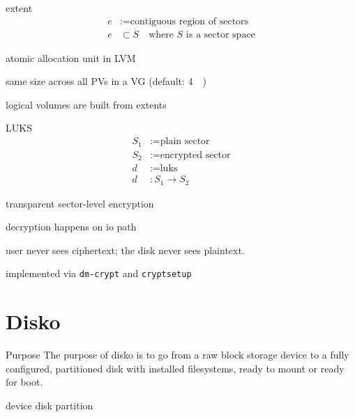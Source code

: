 \documentclass[openany, 12pt]{book}
\begin{document}
\begin{definition}{extent}{}
	\begin{align*}
		e & := \text{contiguous region of sectors}                    \\
		e & \subset S \quad \text{where } S \text{ is a sector space}
	\end{align*}
	\begin{alist}
		\item atomic allocation unit in LVM
		\item same size across all PVs in a VG (default: \SI{4}{\mebi\byte})
		\item logical volumes are built from extents
	\end{alist}
\end{definition}

\begin{definition}{LUKS}{}
	\begin{align*}
		S_1 & := \text{plain sector}     \\
		S_2 & := \text{encrypted sector} \\
		d   & := \text{luks}             \\
		d   & : S_1 \to S_2
	\end{align*}
	\begin{alist}
		\item transparent sector-level encryption
		\item decryption happens on io path
		\item user never sees ciphertext; the disk never sees plaintext.
		\item implemented via \texttt{dm-crypt} and \texttt{cryptsetup}
	\end{alist}
\end{definition}

\chapter{Disko}
\begin{definition}{Purpose}{}
	The purpose of disko is to go from a raw block storage device to a fully
	configured, partitioned disk with installed filesystems, ready to mount or
	ready for boot.
\end{definition}

device
disk
partition
\end{document}
